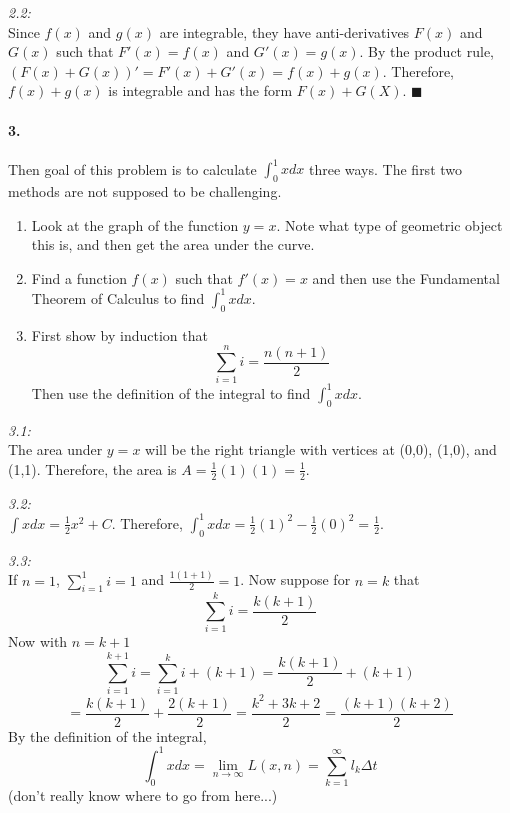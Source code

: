 \documentclass[10pt,a4paper]{article}
\begin{document}
\begin{flushleft}
\textit{2.2:}\\
Since $f(x)$ and $g(x)$ are integrable, they have anti-derivatives $F(x)$ and $G(x)$ such that $F'(x) = f(x)$ and $G'(x) = g(x)$. By the product rule, $(F(x)+G(x))' = F'(x) + G'(x) = f(x) + g(x)$. Therefore, $f(x)+g(x)$ is integrable and has the form $F(x) +G(X)$. $\blacksquare$
\end{flushleft}

\paragraph{3.} Then goal of this problem is to calculate $\int_0^1 xdx$ three ways. The first two methods are not supposed to be challenging.
\begin{enumerate}
\item Look at the graph of the function $y = x$. Note what type of geometric object this is, and then get the area under the curve.
\item Find a function $f(x)$ such that $f'(x) = x$ and then use the Fundamental Theorem of Calculus to find $\int_0^1 xdx$.
\item First show by induction that
$$ \sum_{i=1}^n i = \frac{n(n+1)}{2}$$
Then use the definition of the integral to find $\int_0^1 xdx$.
\end{enumerate}

\begin{flushleft}
\textit{3.1:}\\
The area under $y=x$ will be the right triangle with vertices at (0,0), (1,0), and (1,1). Therefore, the area is $A = \frac{1}{2}(1)(1) = \frac{1}{2}$.
\end{flushleft}

\begin{flushleft}
\textit{3.2:}\\
$\int xdx = \frac{1}{2}x^2 + C$. Therefore, $\int_0^1 xdx = \frac{1}{2}(1)^2 - \frac{1}{2}(0)^2 = \frac{1}{2}$.
\end{flushleft}

\begin{flushleft}
\textit{3.3:}\\
If $n=1$, $\sum_{i=1}^1 i =1$ and $\frac{1(1+1)}{2} = 1$. Now suppose for $n=k$ that
$$ \sum_{i=1}^k i = \frac{k(k+1)}{2}$$
Now with $n=k+1$
$$\sum_{i=1}^{k+1} i = \sum_{i=1}^{k} i + (k+1) = \frac{k(k+1)}{2} +(k+1)$$
$$  = \frac{k(k+1)}{2}+\frac{2(k+1)}{2} = \frac{k^2+3k+2}{2} = \frac{(k+1)(k+2)}{2}$$
By the definition of the integral, 
$$ \int_0^1 x dx = \lim_{n \to \infty} L(x,n) = \sum_{k=1}^\infty l_k \Delta t$$
(don't really know where to go from here...)
\end{flushleft}
\end{document}
